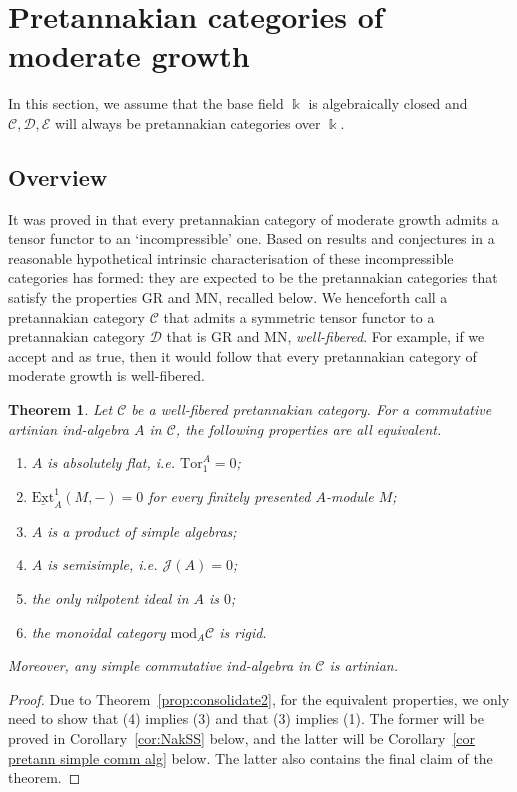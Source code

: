 \documentclass[11pt]{amsart}
\def\JJ{\mathcal{J}}
\def\Cs{\mathscr{C}}
\def\Ds{\mathscr{D}}
\def\Es{\mathscr{E}}
\def\cC{\mathscr{C}}
\def\bk{\Bbbk}
\def\mod{\mathrm{ mod}}
\def\Ext{\mathrm{Ext}}
\def\Tor{\mathrm{Tor}}
\newtheorem{thm}{Theorem}[section]
\theoremstyle{definition}
\theoremstyle{remark}
\numberwithin{equation}{section}
\newcommand{\uExt}{\underline{\Ext}}
\begin{document}
\section{Pretannakian categories of moderate growth}\label{sec:modgr1}





In this section, we assume that the base field $\bk$ is algebraically closed and $\Cs,\Ds,\Es$ will always be pretannakian categories over $\bk$. 


\subsection{Overview}

It was proved in \cite[Theorem~5.2.1]{CEO} that every pretannakian category of moderate growth admits a tensor functor to an `incompressible' one. Based on results and conjectures in \cite{BEO, C1, GR, CEO} a reasonable hypothetical intrinsic characterisation of these incompressible categories has formed: they are expected to be the pretannakian categories that satisfy the properties GR and MN, recalled below. We henceforth call a pretannakian category $\cC$ that admits a symmetric tensor functor to a pretannakian category $\Ds$ that is GR and MN, \emph{well-fibered}. For example, if we accept \cite[Conjecture~1.4]{BEO} and \cite[Conjecture~3.2.3]{C1} as true, then it would follow that every pretannakian category of moderate growth is well-fibered.








\begin{thm}\label{thm:main} Let $\Cs$ be a well-fibered pretannakian category.
     For a commutative artinian ind-algebra $A$ in $\Cs$, the following properties are all equivalent.
    \begin{enumerate}
     \item $A$ is absolutely flat, i.e. $\Tor_1^A=0$;
     \item $\uExt^1_A(M,-)=0$ for every finitely presented $A$-module $M$;
    \item $A$ is a product of simple algebras; 
        \item $A$ is semisimple, i.e. $\JJ(A)=0$;
        \item the only nilpotent ideal in $A$ is $0$;
        
        
       
         \item[(1*)] the monoidal category $\mod_A\Cs$ is rigid.
        \end{enumerate}
        Moreover, any simple commutative ind-algebra in $\cC$ is artinian.
\end{thm}
\begin{proof}
    Due to Theorem~\ref{prop:consolidate2}, for the equivalent properties, we only need to show that (4) implies (3) and that (3) implies (1). The former will be proved in Corollary~\ref{cor:NakSS} below, and the latter will be Corollary~\ref{cor pretann simple comm alg} below. The latter also contains the final claim of the theorem.
\end{proof}
\end{document}
